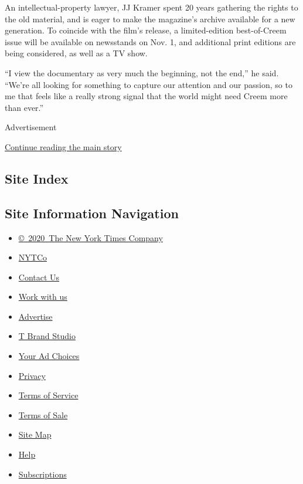 An intellectual-property lawyer, JJ Kramer spent 20 years gathering the
rights to the old material, and is eager to make the magazine's archive
available for a new generation. To coincide with the film's release, a
limited-edition best-of-Creem issue will be available on newsstands on
Nov. 1, and additional print editions are being considered, as well as a
TV show.

``I view the documentary as very much the beginning, not the end,'' he
said. ``We're all looking for something to capture our attention and our
passion, so to me that feels like a really strong signal that the world
might need Creem more than ever.''

Advertisement

\protect\hyperlink{after-bottom}{Continue reading the main story}

\hypertarget{site-index}{%
\subsection{Site Index}\label{site-index}}

\hypertarget{site-information-navigation}{%
\subsection{Site Information
Navigation}\label{site-information-navigation}}

\begin{itemize}
\tightlist
\item
  \href{https://help.nytimes.com/hc/en-us/articles/115014792127-Copyright-notice}{©~2020~The
  New York Times Company}
\end{itemize}

\begin{itemize}
\tightlist
\item
  \href{https://www.nytco.com/}{NYTCo}
\item
  \href{https://help.nytimes.com/hc/en-us/articles/115015385887-Contact-Us}{Contact
  Us}
\item
  \href{https://www.nytco.com/careers/}{Work with us}
\item
  \href{https://nytmediakit.com/}{Advertise}
\item
  \href{http://www.tbrandstudio.com/}{T Brand Studio}
\item
  \href{https://www.nytimes.com/privacy/cookie-policy\#how-do-i-manage-trackers}{Your
  Ad Choices}
\item
  \href{https://www.nytimes.com/privacy}{Privacy}
\item
  \href{https://help.nytimes.com/hc/en-us/articles/115014893428-Terms-of-service}{Terms
  of Service}
\item
  \href{https://help.nytimes.com/hc/en-us/articles/115014893968-Terms-of-sale}{Terms
  of Sale}
\item
  \href{https://spiderbites.nytimes.com}{Site Map}
\item
  \href{https://help.nytimes.com/hc/en-us}{Help}
\item
  \href{https://www.nytimes.com/subscription?campaignId=37WXW}{Subscriptions}
\end{itemize}

